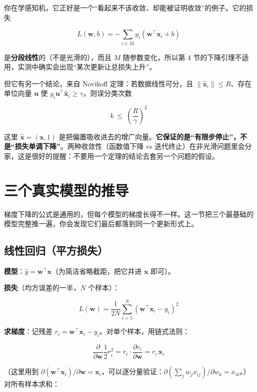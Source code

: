 \documentclass[UTF8, a4paper, zihao=-4, fontset=none]{ctexart}
\begin{document}
你在学感知机，它正好是一个“看起来不该收敛、却能被证明收敛”的例子。它的损失


\[
L(\mathbf{w},b)=-\sum_{i\in M}y_i\left(\mathbf{w}^\top\mathbf{x}_i+b\right)
\]


是\textbf{分段线性}的（不是光滑的），而且 $M$ 随参数变化，所以第 4 节的下降引理不适用，实测中确实会出现“某次更新让总损失上升”。



但它有另一个结论，来自 Novikoff 定理：若数据线性可分，且 $\|\hat{\mathbf{x}}_i\|\le R$、存在单位向量 $\mathbf{u}$ 使 $y_i\mathbf{u}^\top\hat{\mathbf{x}}_i\ge\gamma$，则误分类次数


\[
k\ \le\ \left(\frac{R}{\gamma}\right)^2
\]


这里 $\hat{\mathbf{x}}=(\mathbf{x},1)$ 是把偏置吸收进去的增广向量。\textbf{它保证的是“有限步停止”，不是“损失单调下降”}。两种收敛性（函数值下降 vs 迭代终止）在非光滑问题里会分家，这是很好的提醒：不要用一个定理的结论去套另一个问题的假设。




\section{三个真实模型的推导}



梯度下降的公式是通用的，但每个模型的梯度长得不一样。这一节把三个最基础的模型完整推一遍，你会发现它们最后都落到同一个更新形式上。




\subsection{线性回归（平方损失）}



\textbf{模型}：$\hat{y}=\mathbf{w}^\top\mathbf{x}$（为简洁省略截距，把它并进 $\mathbf{x}$ 即可）。



\textbf{损失}（均方误差的一半，$N$ 个样本）：


\[
L(\mathbf{w})=\frac{1}{2N}\sum_{i=1}^{N}\left(\mathbf{w}^\top\mathbf{x}_i-y_i\right)^2
\]


\textbf{求梯度}：记残差 $r_i=\mathbf{w}^\top\mathbf{x}_i-y_i$。对单个样本，用链式法则：


\[
\frac{\partial}{\partial\mathbf{w}}\frac12 r_i^2=r_i\cdot\frac{\partial r_i}{\partial\mathbf{w}}=r_i\,\mathbf{x}_i
\]


（这里用到 $\partial(\mathbf{w}^\top\mathbf{x}_i)/\partial\mathbf{w}=\mathbf{x}_i$，可以逐分量验证：$\partial(\sum_j w_jx_{ij})/\partial w_k=x_{ik}$。）对所有样本求和：
\end{document}
